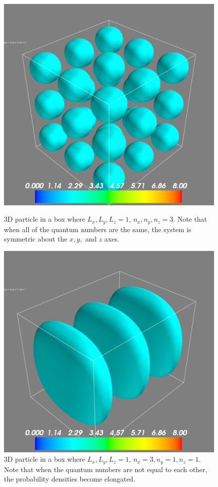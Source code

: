\documentclass[11pt]{article}
\begin{document}
\begin{figure}[!tbp]
	\centering
	\begin{minipage}[b]{0.4\textwidth}
		\includegraphics[width=\textwidth]{3d333}
		\caption{3D particle in a box where $L_x, L_y, L_z = 1$, $n_x, n_y, n_z = 3$. Note that when all of the quantum numbers are the same, the system is symmetric about the $x, y,$ and $z$ axes.}
	\end{minipage}
	\hfill
	\begin{minipage}[b]{0.4\textwidth}
		\includegraphics[width=\textwidth]{3d311}
		\caption{3D particle in a box where $L_x, L_y, L_z = 1$, $n_x = 3, n_y = 1, n_z = 1$. Note that when the quantum numbers are not equal to each other, the probability densities become elongated.}
	\end{minipage}
\end{figure}
\end{document}
